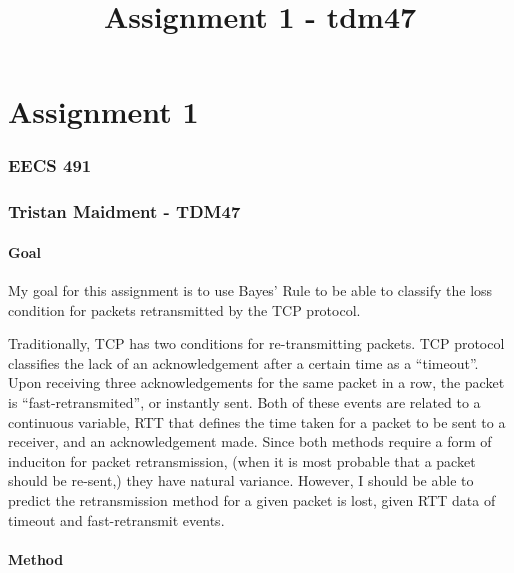 \documentclass[11pt]{article}
\title{Assignment 1 - tdm47}
\begin{document}
    
    
    \maketitle
    
    

    
    \hypertarget{assignment-1}{%
\section{Assignment 1}\label{assignment-1}}

\hypertarget{eecs-491}{%
\subsubsection{EECS 491}\label{eecs-491}}

\hypertarget{tristan-maidment---tdm47}{%
\subsubsection{Tristan Maidment -
TDM47}\label{tristan-maidment---tdm47}}

\hypertarget{goal}{%
\paragraph{Goal}\label{goal}}

My goal for this assignment is to use Bayes' Rule to be able to classify
the loss condition for packets retransmitted by the TCP protocol.

Traditionally, TCP has two conditions for re-transmitting packets. TCP
protocol classifies the lack of an acknowledgement after a certain time
as a ``timeout''. Upon receiving three acknowledgements for the same
packet in a row, the packet is ``fast-retransmited'', or instantly sent.
Both of these events are related to a continuous variable, RTT that
defines the time taken for a packet to be sent to a receiver, and an
acknowledgement made. Since both methods require a form of induciton for
packet retransmission, (when it is most probable that a packet should be
re-sent,) they have natural variance. However, I should be able to
predict the retransmission method for a given packet is lost, given RTT
data of timeout and fast-retransmit events.

\hypertarget{method}{%
\paragraph{Method}\label{method}}
\end{document}
